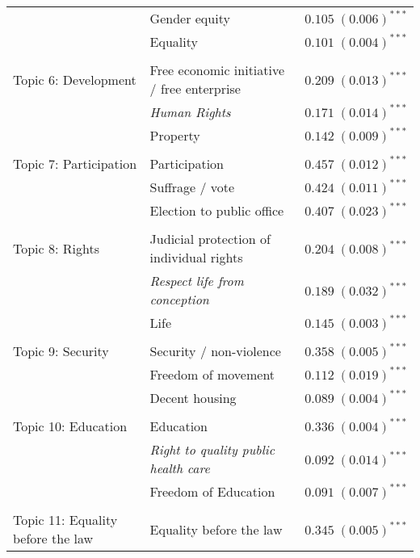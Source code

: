 \documentclass[onecolumn]{article}
\begin{document}
\begin{table}
\begin{center}
\begin{tabular}{l l l }
& Gender equity                                     & $0.105 \; (0.006)^{***}$ \\
& Equality                                          & $0.101 \; (0.004)^{***}$ \\
\hline \\[-1.8ex] 
Topic 6: Development & Free economic initiative / free enterprise        & $0.209 \; (0.013)^{***}$ \\
& \textit{Human Rights}                                      & $0.171 \; (0.014)^{***}$ \\
& Property                                          & $0.142 \; (0.009)^{***}$ \\
\hline \\[-1.8ex] 
Topic 7: Participation & Participation                                        & $0.457 \; (0.012)^{***}$ \\
& Suffrage / vote                                      & $0.424 \; (0.011)^{***}$ \\
& Election to public office                         & $0.407 \; (0.023)^{***}$ \\
\hline \\[-1.8ex] 
Topic 8: Rights & Judicial protection of individual rights          & $0.204 \; (0.008)^{***}$ \\
& \textit{Respect life from conception}                     & $0.189 \; (0.032)^{***}$ \\
& Life                                             & $0.145 \; (0.003)^{***}$ \\
\hline \\[-1.8ex] 
Topic 9: Security & Security / non-violence                              & $0.358 \; (0.005)^{***}$ \\
& Freedom of movement                                  & $0.112 \; (0.019)^{***}$ \\
& Decent housing                                    & $0.089 \; (0.004)^{***}$ \\
\hline \\[-1.8ex] 
Topic 10: Education & Education                                            & $0.336 \; (0.004)^{***}$ \\
& \textit{Right to quality public health care}               & $0.092 \; (0.014)^{***}$ \\
& Freedom of Education                              & $0.091 \; (0.007)^{***}$ \\
\hline \\[-1.8ex] 
Topic 11: Equality before the law & Equality before the law                           & $0.345 \; (0.005)^{***}$ \\

\end{tabular}
\end{center}
\end{table}
\end{document}
